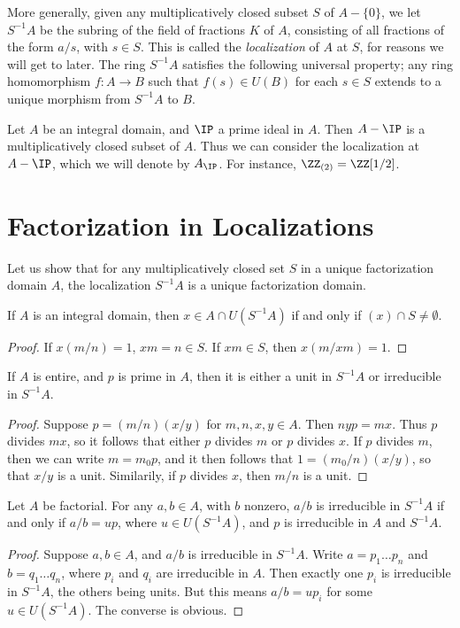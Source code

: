More generally, given any multiplicatively closed subset $S$ of $A - \{ 0 \}$, we let $S^{-1}A$ be the subring of the field of fractions $K$ of $A$, consisting of all fractions of the form $a/s$, with $s \in S$. This is called the \emph{localization} of $A$ at $S$, for reasons we will get to later. The ring $S^{-1}A$ satisfies the following universal property; any ring homomorphism $f: A \to B$ such that $f(s) \in U(B)$ for each $s \in S$ extends to a unique morphism from $S^{-1}A$ to $B$.

\begin{example}
    Let $A$ be an integral domain, and $\IP$ a prime ideal in $A$. Then $A - \IP$ is a multiplicatively closed subset of $A$. Thus we can consider the localization at $A - \IP$, which we will denote by $A_{\IP}$. For instance, $\ZZ_{(2)} = \ZZ[1/2]$.
\end{example}

\section{Factorization in Localizations}

Let us show that for any multiplicatively closed set $S$ in a unique factorization domain $A$, the localization $S^{-1}A$ is a unique factorization domain.

\begin{lemma}
    If $A$ is an integral domain, then $x \in A \cap U(S^{-1}A)$ if and only if $(x) \cap S \neq \emptyset$.
\end{lemma}
\begin{proof}
    If $x (m/n) = 1$, $xm = n \in S$. If $xm \in S$, then $x (m/xm) = 1$.
\end{proof}

\begin{lemma}
    If $A$ is entire, and $p$ is prime in $A$, then it is either a unit in $S^{-1}A$ or irreducible in $S^{-1}A$.
\end{lemma}
\begin{proof}
    Suppose $p = (m/n)(x/y)$ for $m,n,x,y \in A$. Then $nyp = mx$. Thus $p$ divides $mx$, so it follows that either $p$ divides $m$ or $p$ divides $x$. If $p$ divides $m$, then we can write $m = m_0p$, and it then follows that $1 = (m_0/n)(x/y)$, so that $x/y$ is a unit. Similarily, if $p$ divides $x$, then $m/n$ is a unit.
\end{proof}

\begin{lemma}
    Let $A$ be factorial. For any $a,b \in A$, with $b$ nonzero, $a/b$ is irreducible in $S^{-1}A$ if and only if $a/b = up$, where $u \in U(S^{-1}A)$, and $p$ is irreducible in $A$ and $S^{-1}A$.
\end{lemma}
\begin{proof}
    Suppose $a,b \in A$, and $a/b$ is irreducible in $S^{-1}A$. Write $a = p_1 \dots p_n$ and $b = q_1 \dots q_n$, where $p_i$ and $q_i$ are irreducible in $A$. Then exactly one $p_i$ is irreducible in $S^{-1}A$, the others being units. But this means $a/b = up_i$ for some $u \in U(S^{-1}A)$. The converse is obvious.
\end{proof}

